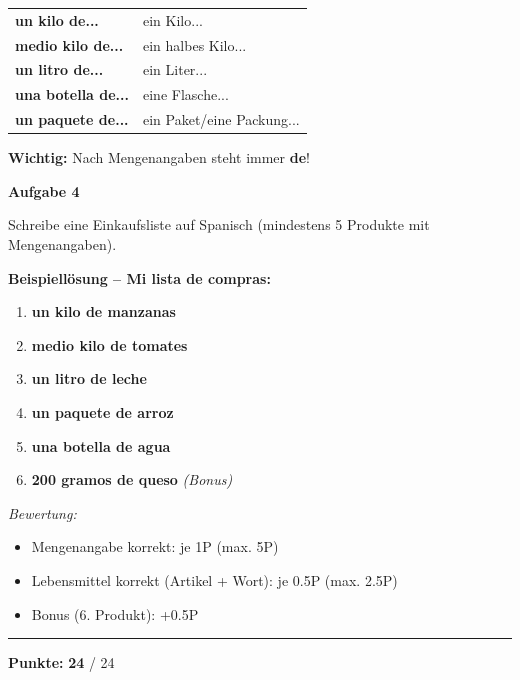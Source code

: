 \documentclass[11pt, a4paper]{article}
\newcommand{\fachfarbe}{spanisch}
\newcommand{\maxpunkte}{24}
\newcommand{\punktebox}[1]{\hfill\fbox{\small \_/#1}}
\newcommand{\loesung}[1]{\textcolor{loesung}{\textbf{#1}}}
\newcommand{\es}[1]{\textcolor{\fachfarbe}{\textbf{#1}}}
\newenvironment{aufgabe}[1]{%
    \vspace{10pt}
    \noindent\textbf{\textcolor{\fachfarbe}{Aufgabe #1}}
    \vspace{5pt}
    \begin{list}{}{\leftmargin=0pt}
    \item[]
}{%
    \end{list}
}
\begin{document}
\vspace{15pt}


\begin{merkkasten}

\begin{tabular}{ll}
\es{un kilo de...} & ein Kilo... \\
\es{medio kilo de...} & ein halbes Kilo... \\
\es{un litro de...} & ein Liter... \\
\es{una botella de...} & eine Flasche... \\
\es{un paquete de...} & ein Paket/eine Packung... \\
\end{tabular}

\vspace{0.5em}
\textbf{Wichtig:} Nach Mengenangaben steht immer \es{de}!
\end{merkkasten}

\vspace{15pt}


\begin{aufgabe}{4}
Schreibe eine Einkaufsliste auf Spanisch (mindestens 5 Produkte mit Mengenangaben). \punktebox{8}
\end{aufgabe}

\textbf{Beispiellösung -- Mi lista de compras:}

\begin{enumerate}
    \item \loesung{un kilo de manzanas}
    \item \loesung{medio kilo de tomates}
    \item \loesung{un litro de leche}
    \item \loesung{un paquete de arroz}
    \item \loesung{una botella de agua}
    \item \loesung{200 gramos de queso} \textit{(Bonus)}
\end{enumerate}

\vspace{0.5em}
\textit{\textcolor{grau}{Bewertung:}}
\begin{itemize}
    \item Mengenangabe korrekt: je 1P (max. 5P)
    \item Lebensmittel korrekt (Artikel + Wort): je 0.5P (max. 2.5P)
    \item Bonus (6. Produkt): +0.5P
\end{itemize}

\vspace{20pt}
\hrule
\vspace{10pt}

\begin{flushright}
\textbf{Punkte:} \loesung{\maxpunkte} / \maxpunkte
\end{flushright}
\end{document}

